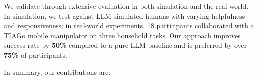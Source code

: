 
We validate \ours{} through extensive evaluation in both simulation and the real world. In simulation, we test against LLM-simulated humans with varying helpfulness and responsiveness; in real-world experiments, 18 participants collaborated with a TIAGo mobile manipulator on three household tasks. Our approach improves success rate by \textbf{50\%} compared to a pure LLM baseline and is preferred by over \textbf{75\%} of participants.


In summary, our contributions are:

